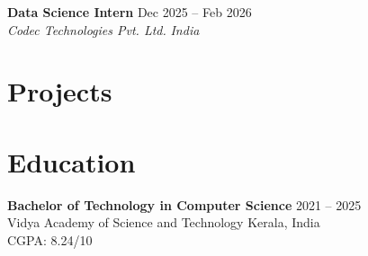\documentclass[a4paper,11pt]{article}
\newcommand{\resumeSubheading}[4]{
    \textbf{#1} \hfill #2 \\[1pt]
    \textit{#3} \hfill \textit{#4}
    \vspace{3pt}
}
\begin{document}
\resumeSubheading
{Data Science Intern}{Dec 2025 -- Feb 2026}
{Codec Technologies Pvt. Ltd.}{India}



\section*{Projects}





\section*{Education}

\textbf{Bachelor of Technology in Computer Science}
\hfill 2021 -- 2025 \\[2pt]
Vidya Academy of Science and Technology
\hfill Kerala, India \\[2pt]
CGPA: 8.24/10


\end{document}
